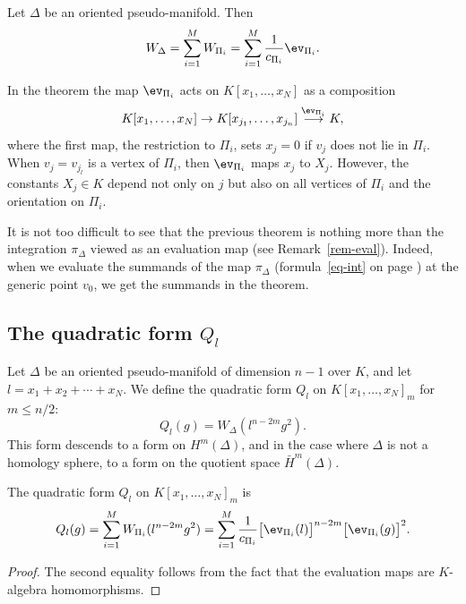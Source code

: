 \begin{theorem} \label{thm-W-sum}
Let $\Delta$ be an oriented pseudo-manifold. Then
\[ W_\Delta = \sum_{i=1}^M W_{\Pi_i} = \sum_{i=1}^M \frac{1}{c_{\Pi_i}} \ev_{\Pi_i}.\]
\end{theorem}

In the theorem the map $\ev_{\Pi_i}$ acts on $K[x_1,\ldots,x_N]$ as a composition
\[ K[x_1,\ldots, x_N] \to K[x_{j_1},\ldots, x_{j_n}] \stackrel{\ev_{\Pi_i}}{\longrightarrow} K,\]
where the first map, the restriction to $\Pi_i$, sets $x_j=0$ if $v_j$ does not lie in $\Pi_i$. When $v_j = v_{j_l}$ is a vertex of $\Pi_i$, then $\ev_{\Pi_i}$ maps $x_j$ to $X_j$. However, the constants $X_j\in K$ depend not only on $j$ but also on all vertices of $\Pi_i$ and the orientation on $\Pi_i$.

\begin{rema} 
It is not too difficult to see that the previous theorem is nothing more than the integration $\pi_\Delta$ viewed as an evaluation map (see Remark~\ref{rem-eval}). Indeed, when we evaluate the summands of the map $\pi_\Delta$ (formula~\eqref{eq-int} on page \pageref{eq-int}) at the generic point $v_0$, we get the summands in the theorem.
\end{rema} 


\subsection{The quadratic form $Q_l$}
Let $\Delta$ be an oriented pseudo-manifold of dimension $n-1$ over $K$, and let  $l=x_1+x_2+\cdots+x_N$. We define the quadratic form $Q_l$ on $K[x_1,\ldots, x_N]_m$ for $m\leq n/2$:
\[ Q_l(g) =  W_\Delta(l^{n-2m}g^2).\]
This form descends to a form on $H^m(\Delta)$, and in the case where $\Delta$ is not a homology sphere, to a form on the quotient space $\bar{H}^m(\Delta)$.

\begin{theorem} \label{thm-Q}
The quadratic form $Q_l$ on $K[x_1,\ldots, x_N]_m$ is
\[ Q_l (g) = \sum_{i=1}^M W_{\Pi_i} (l^{n-2m} g^2) = \sum_{i=1}^M \frac{1}{c_{\Pi_i}} \big[\ev_{\Pi_i} (l)\big]^{n-2m} \big[\ev_{\Pi_i} (g)\big]^2.\]
\end{theorem}
\begin{proof}
The second equality follows from the fact that the evaluation maps are $K$-algebra homomorphisms.
\end{proof}

